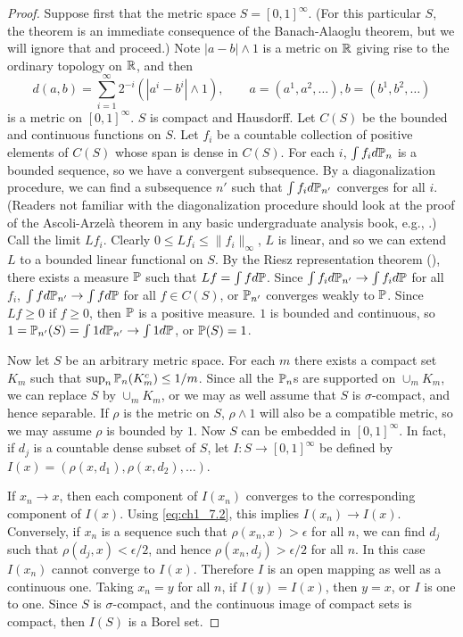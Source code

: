 \begin{proof}
Suppose first that the metric space $S = [0,1]^\infty$. (For this particular $S$, the theorem is an immediate consequence of the Banach-Alaoglu theorem, but we will ignore that and proceed.) Note $|a-b| \wedge 1$ is a metric on $\R$ giving rise to the ordinary topology on $\R$, and then
\mpagebreak
\begin{equation}\label{eq:ch1_7.2}
    d(a,b) = \sum_{i=1}^{\infty} 2^{-i}(|a^i - b^i| \wedge 1), \qquad a=(a^1,a^2,\ldots), b=(b^1,b^2,\ldots)
\end{equation}
is a metric on $[0,1]^\infty$. $S$ is compact and Hausdorff. Let $C(S)$ be the bounded and continuous functions on $S$. Let $f_i$ be a countable collection of positive elements of $C(S)$ whose span is dense in $C(S)$. For each $i$, $\int f_i d\P_n$ is a bounded sequence, so we have a convergent subsequence. By a diagonalization procedure, we can find a subsequence $n'$ such that $\int f_i d\P_{n'}$ converges for all $i$. (Readers not familiar with the diagonalization procedure should look at the proof of the Ascoli-Arzel\`a theorem in any basic undergraduate analysis book, e.g., \cite{Rudin1976}.) Call the limit $Lf_i$. Clearly $0 \leq Lf_i \leq \|f_i\|_\infty$, $L$ is linear, and so we can extend $L$ to a bounded linear functional on $S$. By the Riesz representation theorem (\cite[see][]{Rudin1974}), there exists a measure $\P$ such that $Lf = \int f d\P$. Since $\int f_i d\P_{n'} \to \int f_i d\P$ for all $f_i$, $\int f d\P_{n'} \to \int f d\P$ for all $f \in C(S)$, or $\P_{n'}$ converges weakly to $\P$. Since $Lf \geq 0$ if $f \geq 0$, then $\P$ is a positive measure. $1$ is bounded and continuous, so $1 = \P_{n'}(S) = \int 1 d\P_{n'} \to \int 1 d\P$, or $\P(S) = 1$.

Now let $S$ be an arbitrary metric space. For each $m$ there exists a compact set $K_m$ such that $\sup_n \P_n(K_m^c) \leq 1/m$. Since all the $\P_n$s are supported on $\cup_m K_m$, we can replace $S$ by $\cup_m K_m$, or we may as well assume that $S$ is $\sigma$-compact, and hence separable. If $\rho$ is the metric on $S$, $\rho \wedge 1$ will also be a compatible metric, so we may assume $\rho$ is bounded by $1$. Now $S$ can be embedded in $[0,1]^\infty$. In fact, if $d_j$ is a countable dense subset of $S$, let $I : S \to [0,1]^\infty$ be defined by $I(x) = (\rho(x,d_1), \rho(x,d_2),\ldots)$.

If $x_n \to x$, then each component of $I(x_n)$ converges to the corresponding component of $I(x)$. Using \eqref{eq:ch1_7.2}, this implies $I(x_n) \to I(x)$. Conversely, if $x_n$ is a sequence such that $\rho(x_n,x) > \epsilon$ for all $n$, we can find $d_j$ such that $\rho(d_j,x) < \epsilon/2$, and hence $\rho(x_n,d_j) > \epsilon/2$ for all $n$. In this case $I(x_n)$ cannot converge to $I(x)$. Therefore $I$ is an open mapping as well as a continuous one. Taking $x_n = y$ for all $n$, if $I(y) = I(x)$, then $y = x$, or $I$ is one to one. Since $S$ is $\sigma$-compact, and the continuous image of compact sets is compact, then $I(S)$ is a Borel set.


\end{proof}
